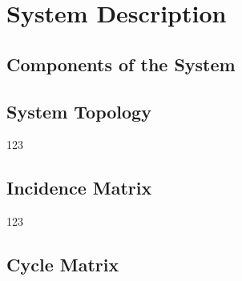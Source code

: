 \chapter{System Description}
\label{system_description}

\section{Components of the System}
\label{systemcomponents}
%


\pagebreak


\section{System Topology}
\label{systemdiagram}

123

\section{Incidence Matrix}
\label{IncidenceSection}

123

\section{Cycle Matrix}
\label{CycleAppendix}
\vspace{4mm}






